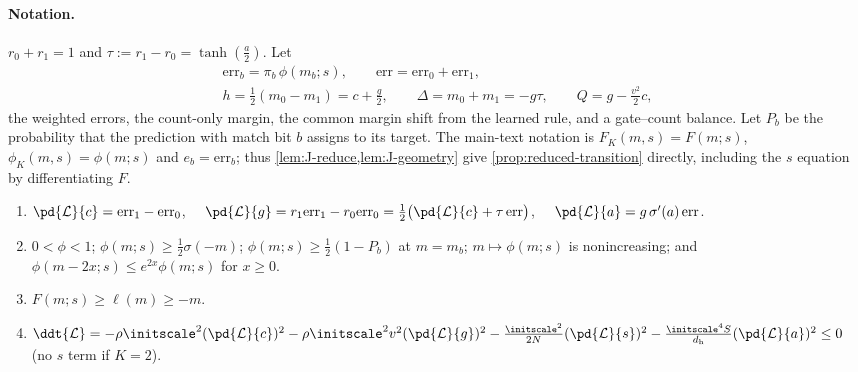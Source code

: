 \paragraph{Notation.} $r_0+r_1=1$ and $\tau:=r_1-r_0=\tanh(\frac{a}{2})$. Let
\begin{gather*}
 \mathrm{err}_b=\pi_b\,\phi(m_b;s),\qquad \mathrm{err}=\mathrm{err}_0+\mathrm{err}_1,\\
 h=\tfrac{1}{2}(m_0-m_1)=c+\tfrac{g}{2},\qquad \Delta=m_0+m_1=-g\tau,\qquad Q=g-\tfrac{v^2}{2}c,
\end{gather*}
the weighted errors, the count-only margin, the common margin shift from the learned rule, and a gate--count balance. Let $P_b$ be the
probability that the prediction with match bit $b$ assigns to its target.
The main-text notation is $F_K(m,s)=F(m;s)$, $\phi_K(m,s)=\phi(m;s)$ and $e_b=\mathrm{err}_b$;
thus \cref{lem:J-reduce,lem:J-geometry} give \cref{prop:reduced-transition} directly, including the $s$ equation by differentiating $F$.

\begin{lemma}[Derivatives]
\label{lem:J-geometry}
\begin{enumerate}[label=(\alph*),leftmargin=*,itemsep=2pt,topsep=3pt]
\item $\pd{\mathcal L}{c}=\mathrm{err}_1-\mathrm{err}_0$, $\quad\pd{\mathcal L}{g}=r_1\mathrm{err}_1-r_0\mathrm{err}_0=\tfrac{1}{2}\bigl(\pd{\mathcal L}{c}+\tau\,\mathrm{err}\bigr)$, $\quad\pd{\mathcal L}{a}=g\,\sigma'(a)\,\mathrm{err}$.
\item $0<\phi<1$; $\phi(m;s)\ge\frac{1}{2}\sigma(-m)$; $\phi(m;s)\ge\frac{1}{2}(1-P_b)$ at $m=m_b$; $m\mapsto\phi(m;s)$ is nonincreasing; and
$\phi(m-2x;s)\le e^{2x}\phi(m;s)$ for $x\ge0$.
\item $F(m;s)\ge\ell(m)\ge-m$.
\item $\ddt{\mathcal L}=-\rho\initscale^2(\pd{\mathcal L}{c})^2-\rho\initscale^2v^2(\pd{\mathcal L}{g})^2-\frac{\initscale^2}{2N}(\pd{\mathcal L}{s})^2-\frac{\initscale^4S}{d_{\mathrm h}}(\pd{\mathcal L}{a})^2\le0$ (no $s$ term if $K=2$).
\end{enumerate}
\end{lemma}

